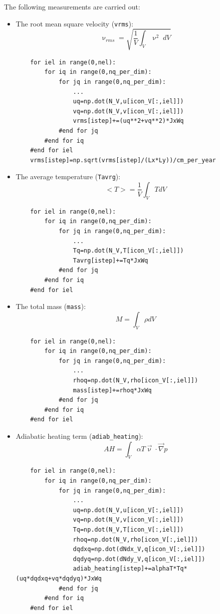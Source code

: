 The following measurements are carried out:
\begin{itemize}

\item The root mean square velocity (\lstinline{vrms}):
\[
\upnu_{rms} = \sqrt{\frac{1}{V} \int_V \upnu^2 \; dV }
\]
\begin{lstlisting}
    for iel in range(0,nel):
        for iq in range(0,nq_per_dim):
            for jq in range(0,nq_per_dim):
                ...
                uq=np.dot(N_V,u[icon_V[:,iel]])
                vq=np.dot(N_V,v[icon_V[:,iel]])
                vrms[istep]+=(uq**2+vq**2)*JxWq
            #end for jq
        #end for iq
    #end for iel
    vrms[istep]=np.sqrt(vrms[istep]/(Lx*Ly))/cm_per_year
\end{lstlisting}

\item The average temperature (\lstinline{Tavrg}):
\[
<T>=\frac{1}{V} \int_V T dV
\]
\begin{lstlisting}
    for iel in range(0,nel):
        for iq in range(0,nq_per_dim):
            for jq in range(0,nq_per_dim):
                ...
                Tq=np.dot(N_V,T[icon_V[:,iel]])
                Tavrg[istep]+=Tq*JxWq
            #end for jq
        #end for iq
    #end for iel
\end{lstlisting}

\item The total mass (\lstinline{mass}):
\[
M=\int_V \rho dV 
\]
\begin{lstlisting}
    for iel in range(0,nel):
        for iq in range(0,nq_per_dim):
            for jq in range(0,nq_per_dim):
                ...
                rhoq=np.dot(N_V,rho[icon_V[:,iel]])
                mass[istep]+=rhoq*JxWq
            #end for jq
        #end for iq
    #end for iel
\end{lstlisting}

\item Adiabatic heating term (\lstinline{adiab_heating}):
\[
AH = \int_V \alpha T \vec{\upnu} \cdot \vec\nabla p
\]

\begin{lstlisting}
    for iel in range(0,nel):
        for iq in range(0,nq_per_dim):
            for jq in range(0,nq_per_dim):
                ...
                uq=np.dot(N_V,u[icon_V[:,iel]])
                vq=np.dot(N_V,v[icon_V[:,iel]])
                Tq=np.dot(N_V,T[icon_V[:,iel]])
                rhoq=np.dot(N_V,rho[icon_V[:,iel]])
                dqdxq=np.dot(dNdx_V,q[icon_V[:,iel]])
                dqdyq=np.dot(dNdy_V,q[icon_V[:,iel]])
                adiab_heating[istep]+=alphaT*Tq*(uq*dqdxq+vq*dqdyq)*JxWq
            #end for jq
        #end for iq
    #end for iel
\end{lstlisting}





\end{itemize}
